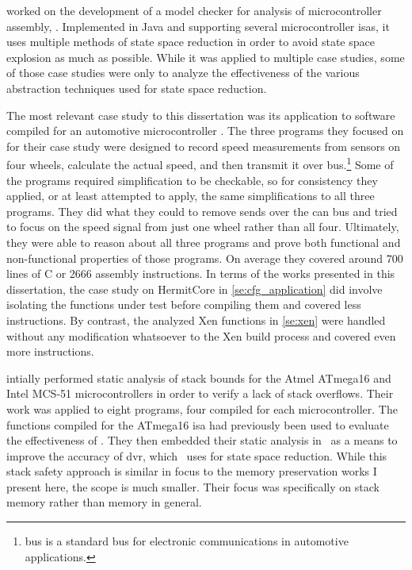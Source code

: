 \Textcite{schlich2008phd} worked on the development of a model checker for analysis
of microcontroller assembly, \mcsquare.
Implemented in Java and supporting several microcontroller \acp{isa},
it uses multiple methods of state space reduction in order to avoid state space explosion
as much as possible. While it was applied to multiple case studies,
some of those case studies were only to analyze the effectiveness
of the various abstraction techniques used for state space reduction.

The most relevant case study to this dissertation was its application
to software compiled for an automotive microcontroller \autocite{schlich2007automotive}.
The three programs they focused on for their case study
were designed to record speed measurements from sensors on four wheels,
calculate the actual speed, and then transmit it over  bus.\footnote{%
   bus is a standard bus for electronic communications in automotive applications.%
}
Some of the programs required simplification to be checkable,
so for consistency they applied, or at least attempted to apply,
the same simplifications to all three programs.
They did what they could to remove sends over the \ac{can} bus
and tried to focus on the speed signal from just one wheel rather than all four.
Ultimately, they were able to reason about all three programs
and prove both functional and non-functional properties of those programs.
On average they covered around 700 lines of C or \num{2666} assembly instructions.
In terms of the works presented in this dissertation,
the case study on HermitCore in \cref{se:cfg_application}
did involve isolating the functions under test before compiling them
and covered less instructions.
By contrast, the analyzed Xen functions in \cref{se:xen} were handled
without any modification whatsoever to the Xen build process
and covered even more instructions.

\Textcite{brauer2009sba} intially performed static analysis of stack bounds
for the Atmel ATmega16 and Intel MCS-51 microcontrollers
in order to verify a lack of stack overflows.
Their work was applied to eight programs, four compiled for each microcontroller.
The functions compiled for the ATmega16 \ac{isa}
had previously been used to evaluate the effectiveness of \mcsquare.
They then embedded their static analysis in \mcsquare\ as a means to
improve the accuracy of \ac{dvr}, which \mcsquare\ uses for state space reduction.
While this stack safety approach is similar in focus to the memory preservation works
I present here, the scope is much smaller.
Their focus was specifically on stack memory rather than memory in general.

